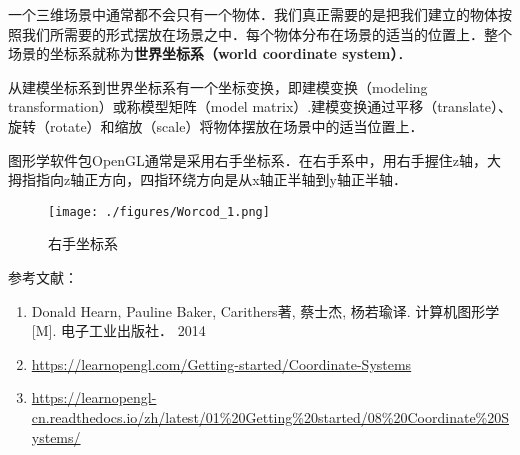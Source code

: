 

一个三维场景中通常都不会只有一个物体．我们真正需要的是把我们建立的物体按照我们所需要的形式摆放在场景之中．每个物体分布在场景的适当的位置上．整个场景的坐标系就称为\textbf{世界坐标系（world coordinate system）}．

从建模坐标系到世界坐标系有一个坐标变换，即建模变换（modeling transformation）或称模型矩阵（model matrix）.建模变换通过平移（translate）、旋转（rotate）和缩放（scale）将物体摆放在场景中的适当位置上．

图形学软件包OpenGL通常是采用右手坐标系．在右手系中，用右手握住z轴，大拇指指向z轴正方向，四指环绕方向是从x轴正半轴到y轴正半轴．


\begin{figure}[ht]
\centering
\texttt{[image: ./figures/Worcod\_1.png]}
\caption{右手坐标系} \label{Worcod_fig1}
\end{figure}

参考文献：
\begin{enumerate}
\item Donald Hearn, Pauline Baker, Carithers著, 蔡士杰, 杨若瑜译. 计算机图形学[M]. 电子工业出版社． 2014
\item \href{https://learnopengl.com/Getting-started/Coordinate-Systems}{https://learnopengl.com/Getting-started/Coordinate-Systems}
\item \href{https://learnopengl-cn.readthedocs.io/zh/latest/01\%20Getting\%20started/08\%20Coordinate\%20Systems/}{https://learnopengl-cn.readthedocs.io/zh/latest/01\%20Getting\%20started/08\%20Coordinate\%20Systems/}
\end{enumerate}